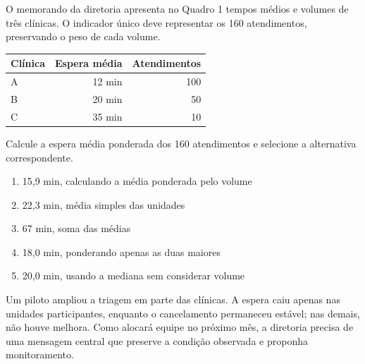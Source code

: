 
\TextoBase

O memorando da diretoria apresenta no Quadro 1 tempos médios e volumes de três clínicas. O indicador único deve representar os 160 atendimentos, preservando o peso de cada volume.
\begin{DocumentBox}
\begin{tabularx}{\textwidth}{@{}Yrr@{}}\toprule
\textbf{Clínica} & \textbf{Espera média} & \textbf{Atendimentos}\\\midrule
A & 12 min & 100\\ B & 20 min & 50\\ C & 35 min & 10\\\bottomrule
\end{tabularx}
\end{DocumentBox}

\FonteDidatica

\Comando Calcule a espera média ponderada dos 160 atendimentos e selecione a alternativa correspondente.

\begin{enumerate}[label=\Alph*)]

\item 15,9 min, calculando a média ponderada pelo volume

\item 22,3 min, média simples das unidades

\item 67 min, soma das médias

\item 18,0 min, ponderando apenas as duas maiores

\item 20,0 min, usando a mediana sem considerar volume

\end{enumerate}


\TextoBase

Um piloto ampliou a triagem em parte das clínicas. A espera caiu apenas nas unidades participantes, enquanto o cancelamento permaneceu estável; nas demais, não houve melhora. Como alocará equipe no próximo mês, a diretoria precisa de uma mensagem central que preserve a condição observada e proponha monitoramento.

\FonteDidatica

